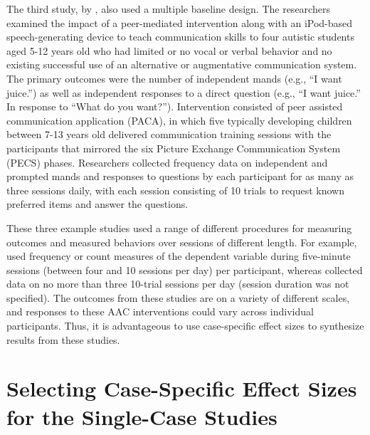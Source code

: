 \documentclass[
]{book}
\begin{document}
The third study, by \citet{StrasbergerFerreri2014}, also used a multiple baseline design. The researchers examined the impact of a peer-mediated intervention along with an iPod-based speech-generating device to teach communication skills to four autistic students aged 5-12 years old who had limited or no vocal or verbal behavior and no existing successful use of an alternative or augmentative communication system. The primary outcomes were the number of independent mands (e.g., ``I want juice.'') as well as independent responses to a direct question (e.g., ``I want juice.'' In response to ``What do you want?''). Intervention consisted of peer assisted communication application (PACA), in which five typically developing children between 7-13 years old delivered communication training sessions with the participants that mirrored the six Picture Exchange Communication System (PECS) phases. Researchers collected frequency data on independent and prompted mands and responses to questions by each participant for as many as three sessions daily, with each session consisting of 10 trials to request known preferred items and answer the questions.

These three example studies used a range of different procedures for measuring outcomes and measured behaviors over sessions of different length. For example, \citet{Byiers2014} used frequency or count measures of the dependent variable during five-minute sessions (between four and 10 sessions per day) per participant, whereas \citet{StrasbergerFerreri2014} collected data on no more than three 10-trial sessions per day (session duration was not specified). The outcomes from these studies are on a variety of different scales, and responses to these AAC interventions could vary across individual participants. Thus, it is advantageous to use case-specific effect sizes to synthesize results from these studies.

\hypertarget{selecting-case-specific-effect-sizes-for-the-single-case-studies}{%
\section{Selecting Case-Specific Effect Sizes for the Single-Case Studies}\label{selecting-case-specific-effect-sizes-for-the-single-case-studies}}
\end{document}
